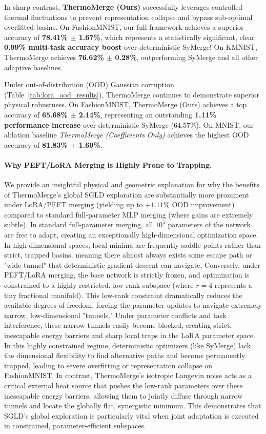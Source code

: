 In sharp contrast, \textbf{ThermoMerge (Ours)} successfully leverages controlled thermal fluctuations to prevent representation collapse and bypass sub-optimal overfitted basins.
On FashionMNIST, our full framework achieves a superior accuracy of \textbf{78.41\% $\pm$ 1.67\%}, which represents a statistically significant, clear \textbf{0.99\% multi-task accuracy boost} over deterministic SyMerge!
On KMNIST, ThermoMerge achieves \textbf{76.62\% $\pm$ 0.28\%}, outperforming SyMerge and all other adaptive baselines.

Under out-of-distribution (OOD) Gaussian corruption (Table~\ref{tab:lora_ood_results}), ThermoMerge continues to demonstrate superior physical robustness.
On FashionMNIST, ThermoMerge (Ours) achieves a top accuracy of \textbf{65.68\% $\pm$ 2.14\%}, representing an outstanding \textbf{1.11\% performance increase} over deterministic SyMerge ($64.57\%$).
On MNIST, our ablation baseline \emph{ThermoMerge (Coefficients Only)} achieves the highest OOD accuracy of \textbf{81.83\% $\pm$ 1.69\%}.

\paragraph{Why PEFT/LoRA Merging is Highly Prone to Trapping.} We provide an insightful physical and geometric explanation for why the benefits of ThermoMerge's global SGLD exploration are substantially more prominent under LoRA/PEFT merging (yielding up to $+1.11\%$ OOD improvement) compared to standard full-parameter MLP merging (where gains are extremely subtle).
In standard full-parameter merging, all $10^5$ parameters of the network are free to adapt, creating an exceptionally high-dimensional optimization space.
In high-dimensional spaces, local minima are frequently saddle points rather than strict, trapped basins, meaning there almost always exists some escape path or "wide tunnel" that deterministic gradient descent can navigate.
Conversely, under PEFT/LoRA merging, the base network is strictly frozen, and optimization is constrained to a highly restricted, low-rank subspace (where $r = 4$ represents a tiny fractional manifold).
This low-rank constraint dramatically reduces the available degrees of freedom, forcing the parameter updates to navigate extremely narrow, low-dimensional "tunnels." Under parameter conflicts and task interference, these narrow tunnels easily become blocked, creating strict, inescapable energy barriers and sharp local traps in the LoRA parameter space.
In this highly constrained regime, deterministic optimizers (like SyMerge) lack the dimensional flexibility to find alternative paths and become permanently trapped, leading to severe overfitting or representation collapse on FashionMNIST.
In contrast, ThermoMerge's isotropic Langevin noise acts as a critical external heat source that pushes the low-rank parameters over these inescapable energy barriers, allowing them to jointly diffuse through narrow tunnels and locate the globally flat, synergistic minimum.
This demonstrates that SGLD's global exploration is particularly vital when joint adaptation is executed in constrained, parameter-efficient subspaces.

